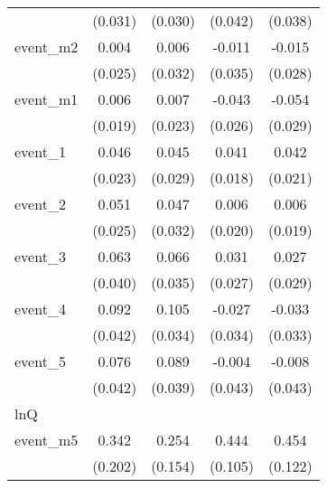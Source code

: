 {\begin{tabular}{l*{4}{c}}
            &     (0.031)         &     (0.030)         &     (0.042)         &     (0.038)         \\
[1em]
event\_m2    &       0.004         &       0.006         &      -0.011         &      -0.015         \\
            &     (0.025)         &     (0.032)         &     (0.035)         &     (0.028)         \\
[1em]
event\_m1    &       0.006         &       0.007         &      -0.043         &      -0.054         \\
            &     (0.019)         &     (0.023)         &     (0.026)         &     (0.029)         \\
[1em]
event\_1     &       0.046\sym{*}  &       0.045         &       0.041\sym{*}  &       0.042\sym{*}  \\
            &     (0.023)         &     (0.029)         &     (0.018)         &     (0.021)         \\
[1em]
event\_2     &       0.051\sym{*}  &       0.047         &       0.006         &       0.006         \\
            &     (0.025)         &     (0.032)         &     (0.020)         &     (0.019)         \\
[1em]
event\_3     &       0.063         &       0.066         &       0.031         &       0.027         \\
            &     (0.040)         &     (0.035)         &     (0.027)         &     (0.029)         \\
[1em]
event\_4     &       0.092\sym{*}  &       0.105\sym{**} &      -0.027         &      -0.033         \\
            &     (0.042)         &     (0.034)         &     (0.034)         &     (0.033)         \\
[1em]
event\_5     &       0.076         &       0.089\sym{*}  &      -0.004         &      -0.008         \\
            &     (0.042)         &     (0.039)         &     (0.043)         &     (0.043)         \\
\hline
lnQ         &                     &                     &                     &                     \\
event\_m5    &       0.342         &       0.254         &       0.444\sym{***}&       0.454\sym{***}\\
            &     (0.202)         &     (0.154)         &     (0.105)         &     (0.122)         \\

\end{tabular}}
